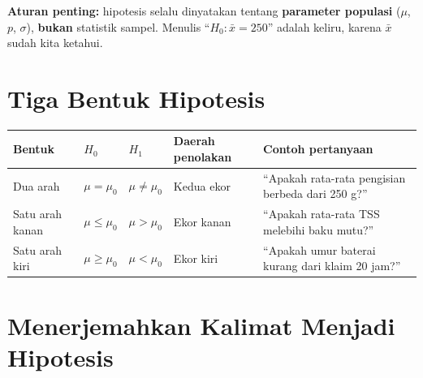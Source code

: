 \documentclass[
  indonesian,
  letterpaper,
]{book}
\newcounter{none} %
\begin{document}
\textbf{Aturan penting:} hipotesis selalu dinyatakan tentang
\textbf{parameter populasi} (\(\mu\), \(p\), \(\sigma\)), \textbf{bukan}
statistik sampel. Menulis ``\(H_0: \bar{x} = 250\)'' adalah keliru,
karena \(\bar{x}\) sudah kita ketahui.

\section{Tiga Bentuk Hipotesis}\label{tiga-bentuk-hipotesis}

{\def\LTcaptype{none} %
\begin{longtable}[]{@{}
  >{\raggedright\arraybackslash}p{}
  >{\raggedright\arraybackslash}p{}
  >{\raggedright\arraybackslash}p{}
  >{\raggedright\arraybackslash}p{}
  >{\raggedright\arraybackslash}p{}@{}}
\toprule\noalign{}
\begin{minipage}[b]{\linewidth}\raggedright
Bentuk
\end{minipage} & \begin{minipage}[b]{\linewidth}\raggedright
\(H_0\)
\end{minipage} & \begin{minipage}[b]{\linewidth}\raggedright
\(H_1\)
\end{minipage} & \begin{minipage}[b]{\linewidth}\raggedright
Daerah penolakan
\end{minipage} & \begin{minipage}[b]{\linewidth}\raggedright
Contoh pertanyaan
\end{minipage} \\
\midrule\noalign{}
\endhead
\bottomrule\noalign{}
\endlastfoot
Dua arah & \(\mu = \mu_0\) & \(\mu \ne \mu_0\) & Kedua ekor & ``Apakah
rata-rata pengisian berbeda dari 250 g?'' \\
Satu arah kanan & \(\mu \le \mu_0\) & \(\mu > \mu_0\) & Ekor kanan &
``Apakah rata-rata TSS melebihi baku mutu?'' \\
Satu arah kiri & \(\mu \ge \mu_0\) & \(\mu < \mu_0\) & Ekor kiri &
``Apakah umur baterai kurang dari klaim 20 jam?'' \\
\end{longtable}
}

\section{Menerjemahkan Kalimat Menjadi
Hipotesis}\label{menerjemahkan-kalimat-menjadi-hipotesis}
\end{document}
